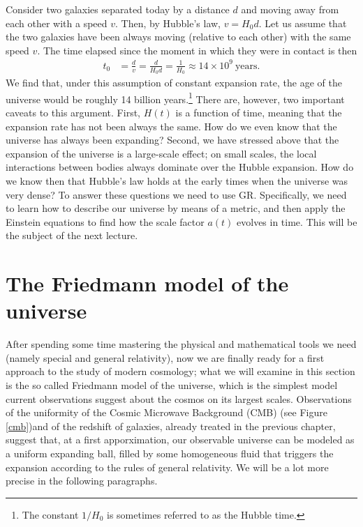 \documentclass[11pt, a4paper,oneside,openright]{book}
\numberwithin{equation}{section}
\begin{document}
Consider two galaxies separated today by a distance $d$ and moving away from each other with a speed $v$. Then, by Hubble's law, $v=H_0 d$. Let us assume that the two galaxies have been always moving (relative to each other) with the same speed $v$. The time elapsed since the moment in which they were in contact is then
\begin{equation}
\begin{split}
t_0&=\frac{d}{v}=\frac{d}{H_0 d}=\frac{1}{H_0}\approx 14\times10^9~\mathrm{years}.
\end{split}
\end{equation}
We find that, under this assumption of constant expansion rate, the age of the universe would be roughly 14 billion years.\footnote{The constant $1/H_0$ is sometimes referred to as the Hubble time.} There are, however, two important caveats to this argument. First, $H(t)$ is a function of time, meaning that the expansion rate has not been always the same. How do we even know that the universe has always been expanding? Second, we have stressed above that the expansion of the universe is a large-scale effect; on small scales, the local interactions between bodies always dominate over the Hubble expansion. How do we know then that Hubble's law holds at the early times when the universe was very dense? To answer these questions we need to use GR. Specifically, we need to learn how to describe our universe by means of a metric, and then apply the Einstein equations to find how the scale factor $a(t)$ evolves in time. This will be the subject of the next lecture.


\chapter{The Friedmann model of the universe}
After spending some time mastering the physical and mathematical tools we need (namely special and general relativity), now we are finally ready for a first approach to the study of modern cosmology; what we will examine in this section is the so called Friedmann model of the universe, which is the simplest model current observations suggest about the cosmos on its largest scales. Observations of the uniformity of the Cosmic Microwave Background (CMB) (see Figure \ref{cmb})and of the redshift of galaxies, already treated in the previous chapter, suggest that, at a first apporximation, our observable universe can be modeled as a uniform expanding ball, filled by some homogeneous fluid that triggers the expansion according to the rules of general relativity. We will be a lot more precise in the following paragraphs.
\end{document}
